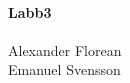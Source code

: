 \documentclass{article}
\begin{document}
\paragraph{Labb3}
Alexander Florean \\
Emanuel Svensson





\end{document}
